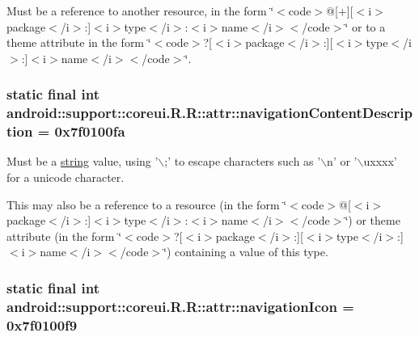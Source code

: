 Must be a reference to another resource, in the form \char`\"{}$<$code$>$@\mbox{[}+\mbox{]}\mbox{[}$<$i$>$package$<$/i$>$:\mbox{]}$<$i$>$type$<$/i$>$:$<$i$>$name$<$/i$>$$<$/code$>$\char`\"{} or to a theme attribute in the form \char`\"{}$<$code$>$?\mbox{[}$<$i$>$package$<$/i$>$:\mbox{]}\mbox{[}$<$i$>$type$<$/i$>$:\mbox{]}$<$i$>$name$<$/i$>$$<$/code$>$\char`\"{}. \hypertarget{classandroid_1_1support_1_1coreui_1_1_r_1_1attr_35407d41e1e1c8b97f507bbcf5e49108}{
\subsubsection[{navigationContentDescription}]{\setlength{\rightskip}{0pt plus 5cm}static final int android::support::coreui.R.R::attr::navigationContentDescription = 0x7f0100fa}}
\label{classandroid_1_1support_1_1coreui_1_1_r_1_1attr_35407d41e1e1c8b97f507bbcf5e49108}


Must be a \hyperlink{classandroid_1_1support_1_1coreui_1_1_r_1_1string}{string} value, using '$\backslash$;' to escape characters such as '$\backslash$n' or '$\backslash$uxxxx' for a unicode character. 

This may also be a reference to a resource (in the form \char`\"{}$<$code$>$@\mbox{[}$<$i$>$package$<$/i$>$:\mbox{]}$<$i$>$type$<$/i$>$:$<$i$>$name$<$/i$>$$<$/code$>$\char`\"{}) or theme attribute (in the form \char`\"{}$<$code$>$?\mbox{[}$<$i$>$package$<$/i$>$:\mbox{]}\mbox{[}$<$i$>$type$<$/i$>$:\mbox{]}$<$i$>$name$<$/i$>$$<$/code$>$\char`\"{}) containing a value of this type. \hypertarget{classandroid_1_1support_1_1coreui_1_1_r_1_1attr_c18d8af6a4c46f8c1e9bd5551b4eef59}{
\subsubsection[{navigationIcon}]{\setlength{\rightskip}{0pt plus 5cm}static final int android::support::coreui.R.R::attr::navigationIcon = 0x7f0100f9}}
\label{classandroid_1_1support_1_1coreui_1_1_r_1_1attr_c18d8af6a4c46f8c1e9bd5551b4eef59}


